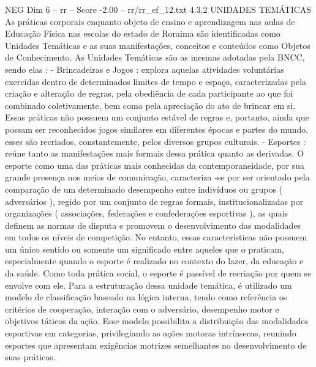 \begin{textsample}{NEG Dim 6 – rr – Score -2.00 – rr/rr\_ef\_12.txt}  \label{ex:f6_neg_071}
4.3.2 UNIDADES TEMÁTICAS As práticas corporais enquanto objeto de ensino e aprendizagem nas aulas de Educação Física nas escolas do estado de Roraima são identificadas como Unidades Temáticas e as suas manifestações, conceitos e conteúdos como Objetos de Conhecimento.
As Unidades Temáticas são as mesmas adotadas pela BNCC, sendo elas : - Brincadeiras e Jogos : explora aquelas atividades voluntárias exercidas dentro de determinados limites de tempo e espaço, caracterizadas pela criação e alteração de regras, pela obediência de cada participante ao que foi combinado coletivamente, bem como pela apreciação do ato de brincar em si.
Essas práticas não possuem um conjunto estável de regras e, portanto, ainda que possam ser reconhecidos jogos similares em diferentes épocas e partes do mundo, esses são recriados, constantemente, pelos diversos grupos culturais. - Esportes : reúne tanto as manifestações mais formais dessa prática quanto as derivadas.
O esporte como uma das práticas mais conhecidas da contemporaneidade, por sua grande presença nos meios de comunicação, caracteriza -se por ser orientado pela comparação de um determinado desempenho entre indivíduos ou grupos ( adversários ), regido por um conjunto de regras formais, institucionalizadas por organizações ( associações, federações e confederações esportivas ), as quais definem as normas de disputa e promovem o desenvolvimento das modalidades em todos os níveis de competição.
No entanto, essas características não possuem um único sentido ou somente um significado entre aqueles que o praticam, especialmente quando o esporte é realizado no contexto do lazer, da educação e da saúde.
Como toda prática social, o esporte é passível de recriação por quem se envolve com ele.
Para a estruturação dessa unidade temática, é utilizado um modelo de classificação baseado na lógica interna, tendo como referência os critérios de cooperação, interação com o adversário, desempenho motor e objetivos táticos da ação.
Esse modelo possibilita a distribuição das modalidades esportivas em categorias, privilegiando as ações motoras intrínsecas, reunindo esportes que apresentam exigências motrizes semelhantes no desenvolvimento de suas práticas.

\end{textsample}
